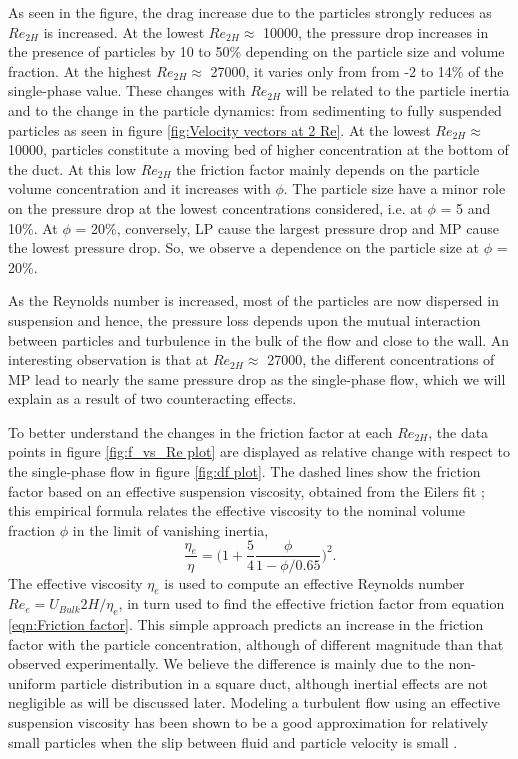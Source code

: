 \documentclass{jfm}
\begin{document}
As seen in the figure, the drag increase  due to the particles strongly reduces as $Re_{2H}$ is increased. At the lowest $Re_{2H}\approx$ 10000, the pressure drop increases in the presence of particles by 10 to 50\% depending on the particle size and volume fraction. At the highest $Re_{2H}\approx$ 27000, it varies only from from -2 to 14\% of the single-phase value. 
These changes with $Re_{2H}$ will be related to the particle inertia and to the change in the particle dynamics: from sedimenting to fully suspended particles as seen in figure \ref{fig:Velocity vectors at 2 Re}. At the lowest $Re_{2H}\approx$ 10000, particles constitute a moving bed of higher concentration at the bottom of the duct. At this low $Re_{2H}$ the friction factor mainly depends on the particle volume concentration and it increases with  $\phi$. The particle size have a minor role on the pressure drop at the lowest concentrations considered, i.e. at $\phi$ = 5 and 10\%. At $\phi$ = 20\%, conversely, LP cause the largest pressure drop and MP cause the lowest pressure drop. So, we observe a dependence on the particle size at $\phi$ = 20\%. 

As the Reynolds number  is increased, most of the particles are now dispersed in suspension and hence, the pressure loss depends upon the mutual interaction between particles and turbulence in the bulk of the flow and close to the wall. 
An interesting observation is that at $Re_{2H}\approx$ 27000, the different concentrations of MP lead to nearly the same pressure drop as the single-phase flow, which we will explain as a result of two counteracting effects.


To better understand the changes in the friction factor at each $Re_{2H}$, the data points in figure \ref{fig:f_vs_Re plot} are displayed as relative change with respect to the single-phase flow in figure \ref{fig:df plot}. The dashed lines show the friction factor based on an effective suspension viscosity, obtained from the Eilers fit \citep{stickel2005fluid}; this empirical formula relates the effective viscosity to the nominal volume fraction $\phi$ in the limit of vanishing inertia,
\begin{equation}
  \frac{\eta_e}{\eta} = \Big(1 + \frac{5}{4}\frac{\phi}{1-\phi/0.65}\Big)^2.
  \label{eqn:Eilers fit}
\end{equation}
The effective viscosity $\eta_e$ is used to compute an effective Reynolds number $Re_e=U_{Bulk}2H/\eta_e$, in turn used to find the effective friction factor from equation \ref{eqn:Friction factor}. This simple approach predicts an increase in the friction factor with the particle concentration, although of different magnitude than that observed experimentally. We believe the difference is mainly due to the non-uniform particle distribution in a square duct,  although inertial effects are not negligible as will be discussed later. Modeling a turbulent flow using an effective suspension viscosity has been shown to be a good approximation for relatively small particles when the slip between fluid and particle velocity is small \citep{costa2016universal}. 
\end{document}
